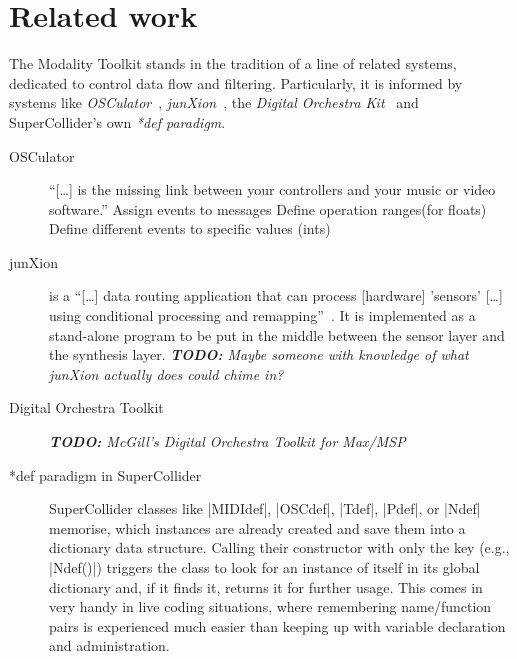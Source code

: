 \documentclass{article}
\newcommand{\todo}[1] {\emph{\textbf{TODO:} #1}}
\begin{document}
\section{Related work}
\label{sec:related_work}

The Modality Toolkit stands in the tradition of a line of related systems, dedicated to control data flow and filtering.
Particularly, it is informed by systems like \emph{OSCulator}~\cite{troillard2012-osc}, \emph{junXion}~\cite{-jun}, the \emph{Digital Orchestra Kit}~\cite{malloch2008-a-n} and SuperCollider's own \emph{*def paradigm}.

\begin{description}
	\item[OSCulator] 
		\enquote{[\dots] is the missing link between your controllers and your music or video software.}
		Assign events to messages
		Define operation ranges(for floats)
		Define different events to specific values (ints) 
	\item[junXion] 
		is a \enquote{[\dots] data routing application that can process [hardware] 'sensors' [\dots] using conditional processing and remapping}~\cite{-jun}. 
		It is implemented as a stand-alone program to be put in the middle between the sensor layer and the synthesis layer.
		\todo{Maybe someone with knowledge of what junXion actually does could chime in?}
	\item[Digital Orchestra Toolkit] \todo{McGill's Digital Orchestra Toolkit for Max/MSP}
	\item[*def paradigm in SuperCollider] 
		SuperCollider classes like |MIDIdef|, |OSCdef|, |Tdef|, |Pdef|, or |Ndef| memorise, which instances are already created and save them into a dictionary data structure. 
		Calling their constructor with only the key (e.g., |Ndef(\a)|) triggers the class to look for an instance of itself in its global dictionary and, if it finds it, returns it for further usage. This comes in very handy in live coding situations, where remembering name/function pairs is experienced much easier than keeping up with variable declaration and administration.
\end{description}
\end{document}
